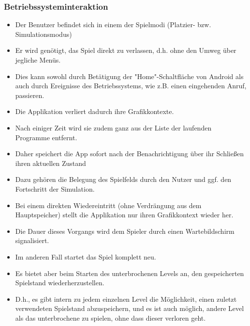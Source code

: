 \subsubsection{Betriebssysteminteraktion}
\begin{itemize}
\item Der Benutzer befindet sich in einem der Spielmodi (Platzier- bzw. 
Simulationsmodus)
\item Er wird genötigt, das Spiel direkt zu verlassen, d.h. ohne den Umweg über jegliche Menüs.
\item Dies kann sowohl durch Betätigung der "Home"-Schaltfläche von Android als auch durch
Ereignisse des Betriebssystems, wie z.B. einen eingehenden Anruf, passieren.
\item Die Applikation verliert dadurch ihre Grafikkontexte.
\item Nach einiger Zeit wird sie zudem ganz aus der Liste der laufenden Programme entfernt.
\item Daher speichert die App sofort nach der Benachrichtigung über ihr Schließen ihren aktuellen Zustand
\item Dazu gehören die Belegung des Spielfelds durch den Nutzer und ggf. den Fortschritt der Simulation.
\item Bei einem direkten Wiedereintritt (ohne Verdrängung aus dem Hauptspeicher) stellt die Applikation nur ihren Grafikkontext wieder her.
\item Die Dauer dieses Vorgangs wird dem Spieler durch einen Wartebildschirm signalisiert.
\item Im anderen Fall startet das Spiel komplett neu.
\item Es bietet aber beim Starten des unterbrochenen Levels an, den gespeicherten Spielstand wiederherzustellen. 
\item D.h., es gibt intern zu jedem einzelnen Level die Möglichkeit,
einen zuletzt verwendeten Spielstand abzuspeichern, und es ist auch möglich, andere Level als das
unterbrochene zu spielen, ohne dass dieser verloren geht.
\end{itemize}
